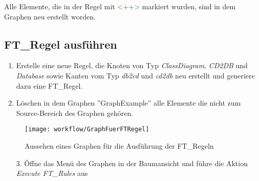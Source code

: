 		Alle Elemente, die in der Regel mit \textcolor{green}{<++>} markiert wurden, sind in dem Graphen neu erstellt worden.
		
		\subsection{FT\_Regel ausführen}
		\begin{enumerate}
			\item Erstelle eine neue Regel, die Knoten von Typ \textit{ClassDiagram}, \textit{CD2DB} und \textit{Database} sowie Kanten vom Typ \textit{db2cd} und \textit{cd2db} neu erstellt und generiere dazu eine FT\_Regel.
			\item Löschen in dem Graphen ''GraphExample'' alle Elemente die nicht zum Source-Bereich des Graphen gehören.
		
		\end{enumerate}
			\begin{figure}[h!] %
				\centering
				\texttt{[image: workflow/GraphFuerFTRegel]}
				\caption{Aussehen eines Graphen für die Ausführung der FT\_Regeln}
				\label{fig:graphFuerFTRegel}
			\end{figure}	
		\begin{enumerate}
			\item[3.] Öffne das Menü des Graphen in der Baumansicht und führe die Aktion \textit{Execute FT\_Rules} aus
		\end{enumerate}

